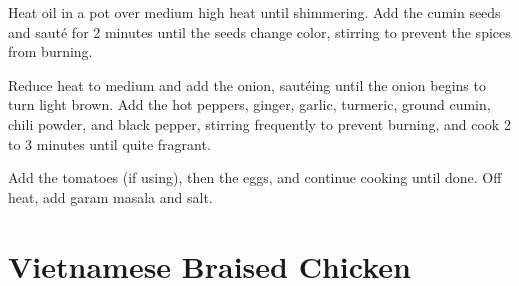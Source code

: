 \documentclass[oneside]{book}  %
\def\thisrecipe{}  %
\newcommand{\recipe}[1]{\section{#1}\def\thisrecipe{: #1}} %
\begin{document}
\begin{directions}
  \item Heat oil in a pot over medium high heat until shimmering. Add the cumin
  seeds and saut\'e for 2 minutes until the seeds change color, stirring to
  prevent the spices from burning.

  \item Reduce heat to medium and add the onion, saut\'eing until the onion
  begins to turn light brown. Add the hot peppers, ginger, garlic, turmeric,
  ground cumin, chili powder, and black pepper, stirring frequently to prevent
  burning, and cook 2 to 3 minutes until quite fragrant.

  \item Add the tomatoes (if using), then the eggs,  and continue cooking until
  done. Off heat, add garam masala and salt.
\end{directions}

\todo[Tomatoes and red cabbage?]
\recipe{Vietnamese Braised Chicken} \label{recipe:vietnamese_braised_chicken} %
\end{document}
